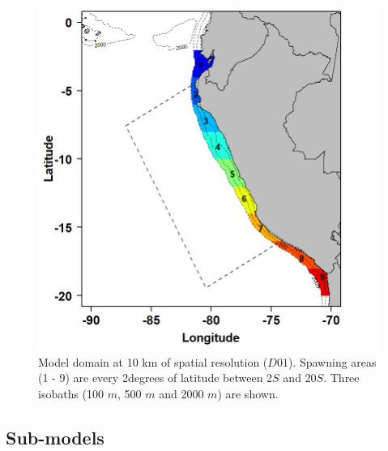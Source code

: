 \begin{figure}[ht]
	\includegraphics[width=1.0\textwidth]{figures/Chap3SpawningZone.png}
	\centering
	\caption{Model domain at 10 km of spatial resolution ($D01$). Spawning areas (1 - 9) are every 2\textdegree degrees of latitude between 2\textdegree $S$ and 20\textdegree $S$. Three isobaths (100 $m$, 500 $m$ and 2000 $m$) are shown.}
	\label{Chap3SpawningZone}
\end{figure}

\subsection{Sub-models}

